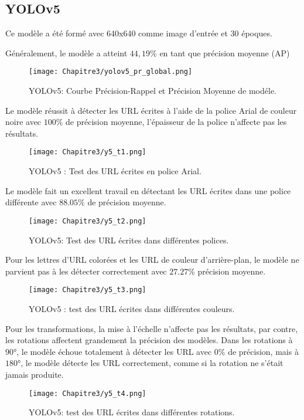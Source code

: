     \subsection{YOLOv5}
     Ce modèle a été formé avec 640x640 comme image d'entrée et 30 époques.
     
     Généralement, le modèle a atteint $44,19\%$ en tant que précision moyenne (AP)
     \begin{figure}[H]
               \centering
               \texttt{[image: Chapitre3/yolov5\_pr\_global.png]}
               \caption{YOLOv5: Courbe Précision-Rappel et Précision Moyenne de modéle.}
               \label{y4_pr}
               \end{figure}
     
     
     Le modèle réussit à détecter les URL écrites à l'aide de la police Arial de couleur noire avec $100\%$ de précision moyenne, l'épaisseur de la police n'affecte pas les résultats. 
     \begin{figure}[H]
               \centering
               \texttt{[image: Chapitre3/y5\_t1.png]}
               \caption{YOLOv5 : Test des URL écrites en police Arial.}
               \label{y5_t1}
               \end{figure}

     Le modèle fait un excellent travail en détectant les URL écrites dans une police différente avec $88.05\%$ de précision moyenne.
     \begin{figure}[H]
               \centering
               \texttt{[image: Chapitre3/y5\_t2.png]}
               \caption{YOLOv5: Test des URL écrites dans différentes polices.}
               \label{y5_t2}
               \end{figure}

     Pour les lettres d'URL colorées et les URL de couleur d'arrière-plan, le modèle ne parvient pas à les détecter correctement avec $27.27\%$ précision moyenne.
     \begin{figure}[H]
               \centering
               \texttt{[image: Chapitre3/y5\_t3.png]}
               \caption{YOLOv5 : test des URL écrites dans différentes couleurs.}
               \label{y5_t3}
               \end{figure}

     Pour les transformations, la mise à l'échelle n'affecte pas les résultats, par contre, les rotations affectent grandement la précision des modèles. Dans les rotations à $90 °$, le modèle échoue totalement à détecter les URL avec $0\%$ de précision, mais à $180 °$, le modèle détecte les URL correctement, comme si la rotation ne s'était jamais produite.
     \begin{figure}[H]
               \centering
               \texttt{[image: Chapitre3/y5\_t4.png]}
               \caption{YOLOv5: test des URL écrites dans différentes rotations.}
               \label{y5_t4}
               \end{figure}
     
